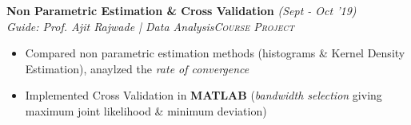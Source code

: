 \documentclass{article}
\begin{document}
\vspace{-5pt}
\textbf{Non Parametric Estimation \& Cross Validation} \hfill{\sl \small (Sept - Oct '19)}\\{\it Guide: Prof. Ajit Rajwade | Data Analysis}\hfill{\sl \small \textsc{Course Project}}\\
\vspace{-19pt}
\begin{itemize}[itemsep = -1 mm, leftmargin=*]
  \item Compared non parametric estimation methods (histograms \& Kernel Density Estimation), anaylzed the \textit{rate of convergence}
    \item Implemented Cross Validation in \textbf{MATLAB} (\textit{bandwidth selection} giving maximum joint likelihood \& minimum deviation) %
\end{itemize}
\end{document}
